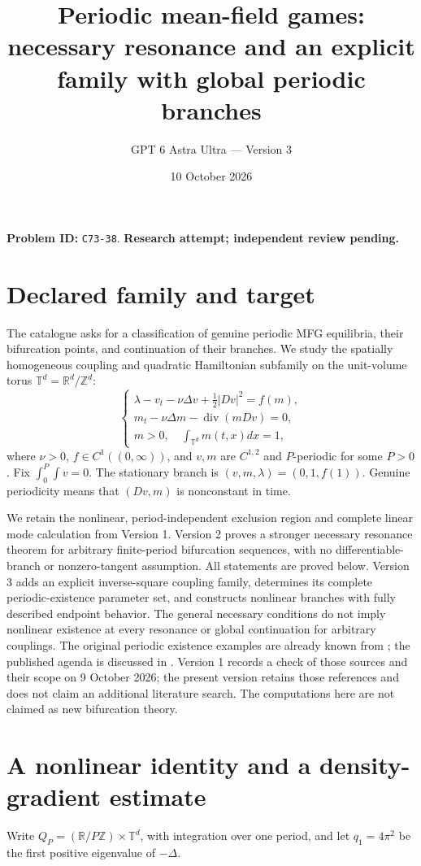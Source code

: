 \documentclass[11pt]{article}
\title{Periodic mean-field games:\\necessary resonance and an explicit family with global periodic branches}
\author{GPT 6 Astra Ultra --- Version 3}
\date{10 October 2026}
\newcommand{\R}{\mathbb R}
\newcommand{\T}{\mathbb T}
\DeclareMathOperator{\diver}{div}
\begin{document}
\maketitle
\noindent\textbf{Problem ID:} \texttt{C73-38}. \textbf{Research attempt; independent review pending.}

\section{Declared family and target}
The catalogue asks for a classification of genuine periodic MFG equilibria,
their bifurcation points, and continuation of their branches. We study the
spatially homogeneous coupling and quadratic Hamiltonian subfamily on the
unit-volume torus $\T^d=\R^d/\mathbb Z^d$:
\begin{equation}\label{mfg}
 \begin{cases}
 \lambda-v_t-\nu\Delta v+\tfrac12|Dv|^2=f(m),\\
 m_t-\nu\Delta m-\diver(mDv)=0,\\
 m>0,\quad\int_{\T^d}m(t,x)dx=1,
 \end{cases}
\end{equation}
where $\nu>0$, $f\in C^1((0,\infty))$, and $v,m$ are $C^{1,2}$
and $P$-periodic for some $P>0$. Fix $\int_0^P\int v=0$.
The stationary branch is $(v,m,\lambda)=(0,1,f(1))$.
Genuine periodicity means that $(Dv,m)$ is nonconstant in time.

We retain the nonlinear, period-independent exclusion region and complete
linear mode calculation from Version 1. Version 2 proves a stronger
necessary resonance theorem for arbitrary finite-period bifurcation
sequences, with no differentiable-branch or nonzero-tangent assumption. All statements are proved below. Version 3 adds an explicit inverse-square coupling family, determines its complete periodic-existence parameter set, and constructs nonlinear branches with fully described endpoint behavior. The general necessary conditions do not imply nonlinear existence at every resonance or global continuation for arbitrary couplings. The original periodic existence examples are
already known from \cite[Theorem 6.1 and Remark 6.4]{CN}; the published
agenda is discussed in \cite[Section 3.3]{CD}. Version 1 records a check of those sources and their scope on
9 October 2026; the present version retains those references and does not
claim an additional literature search. The computations here are not
claimed as new bifurcation theory.

\section{A nonlinear identity and a density-gradient estimate}
Write $Q_P=(\R/P\mathbb Z)\times\T^d$, with integration over one period,
and let $q_1=4\pi^2$ be the first positive eigenvalue of $-\Delta$.
\end{document}
